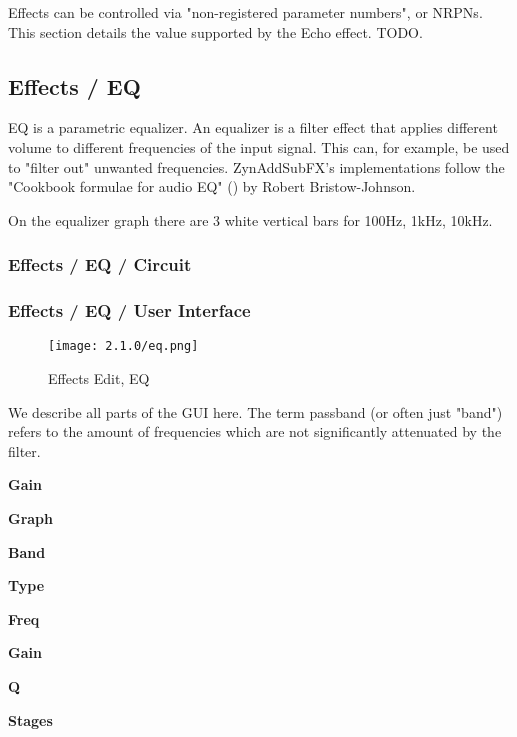    Effects can be controlled via "non-registered parameter numbers", or NRPNs.
   This section details the value supported by the Echo effect.  TODO.

\subsection{Effects / EQ}
\label{subsec:effects_edit_eq}

   EQ is a parametric equalizer.
   An equalizer is a filter effect that applies different volume to different
   frequencies of the input signal. This can, for example, be used to "filter
   out" unwanted frequencies. ZynAddSubFX’s implementations follow the
   "Cookbook formulae for audio EQ" (\cite{cookbookeq})
   by Robert Bristow-Johnson.

   On the equalizer graph there are 3 white
   vertical bars for 100Hz, 1kHz, 10kHz.

\subsubsection{Effects / EQ / Circuit}
\label{subsubsec:effects_edit_eq_circuit}

\iffalse
 No such figure:

 \begin{figure}[H]
    \centering
    \texttt{[image: zyn/effects/eq.png]}
    \caption{EQ Circuit Diagram}
    \label{fig:eq_circuit_diagram}
 \end{figure}
\fi

\subsubsection{Effects / EQ / User Interface}
\label{subsubsec:effects_edit_eq_ui}

\begin{figure}[H]
   \centering
   \texttt{[image: 2.1.0/eq.png]}
   \caption{Effects Edit, EQ}
   \label{fig:effects_edit_eq}
\end{figure}

   We describe all parts of the GUI here. The term passband (or often just
   "band") refers to the amount of frequencies which are not
   significantly attenuated by the filter.

   \begin{enumber}
      \item \textbf{Gain}
      \item \textbf{Graph}
      \item \textbf{Band}
      \item \textbf{Type}
      \item \textbf{Freq}
      \item \textbf{Gain}
      \item \textbf{Q}
      \item \textbf{Stages}
   \end{enumber}

